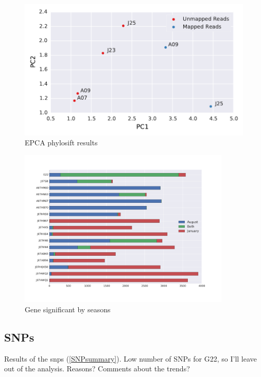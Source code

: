 \begin{figure}[hbt]
  \centering
  \includegraphics[width=\textwidth]{Chapter5/Figures/Unmapped_Mapped_EPCA.pdf}
  \caption{EPCA phylosift results}
  \label{EPCA_results}
\end{figure}

\begin{figure}[!hbtp]
  \centering
  \includegraphics[width=0.9\textwidth]{Chapter5/Figures/GeneDifferencesSeason.pdf}
  \caption{Gene significant by seasons}
  \label{G22coverage}
\end{figure}


\clearpage
\subsection{SNPs}

Results of the snps (\ref{SNPsummary}). Low number of SNPs for G22, so I'll leave out of the analysis. Reasons?
Comments about the trends?


